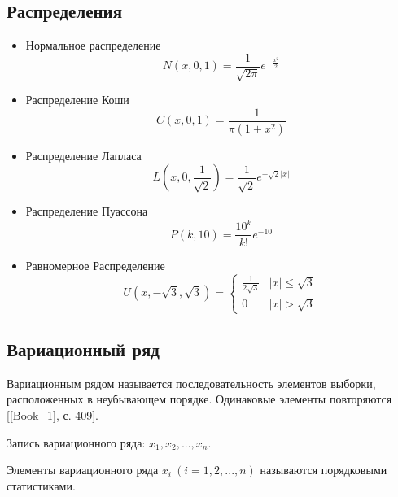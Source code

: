 \documentclass[12pt,a4paper]{article}
\begin{document}
	\subsection{Распределения}
	\begin{itemize}
		\item Нормальное распределение \begin{equation}\label{eqn:normal}
		N(x,0,1) = \frac{1}{\sqrt{2\pi}}e^{-\frac{x^2}{2}}
		\end{equation}
		
		\item Распределение Коши
		\begin{equation}\label{eqn:cauchy}
		C(x,0,1) = \frac{1}{\pi(1+x^2)}
		\end{equation}
		
		\item Распределение Лапласа
		\begin{equation}\label{eqn:laplace}
		L\left( x,0,\frac{1}{\sqrt{2}}\right) = \frac{1}{\sqrt{2}}e^{-\sqrt{2}\vert x\vert}
		\end{equation}
		
		\item Распределение Пуассона
		\begin{equation}\label{eqn:poisson}
		P(k,10) = \frac{10^k}{k!}e^{-10}
		\end{equation}
		
		\item Равномерное Распределение
		\begin{equation}\label{eqn:uniform}
		U(x,-\sqrt{3}, \sqrt{3}) = 
		\begin{cases}
		\frac{1}{2\sqrt{3}} &\vert x\vert \leqslant \sqrt{3}\\
		0 &\vert x\vert > \sqrt{3}
		\end{cases}
		\end{equation}
	\end{itemize}
	
	\subsection{Вариационный ряд}
		Вариационным рядом называется последовательность элементов выборки, расположенных в неубывающем порядке. Одинаковые элементы повторяются  [\ref{Book_1}, с. 409].
		
		Запись вариационного ряда: $x_1, x_2, ... , x_n$.
		
		Элементы вариационного ряда $x_i\ (i = 1,2, ... ,n)$ называются порядковыми статистиками.
	
\end{document}
